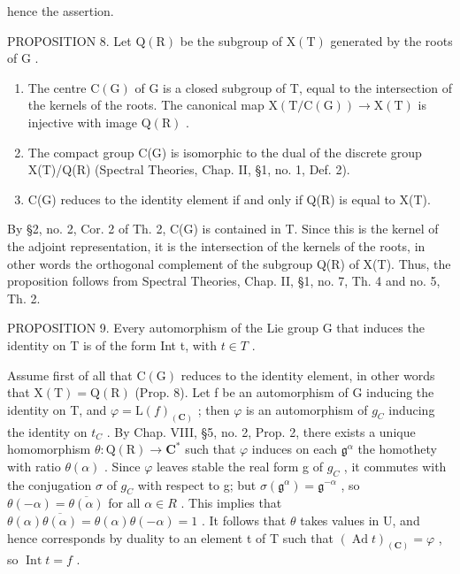 hence the assertion.

PROPOSITION 8. Let \(\mathrm{Q}(\mathrm{R})\) be the subgroup of \(\mathrm{X}(\mathrm{T})\) generated by the roots of \(\mathrm{G}\) .

\begin{enumerate}
\def\labelenumi{\alph{enumi})}
\item
  The centre \(\mathrm{C}(\mathrm{G})\) of G is a closed subgroup of T, equal to the intersection of the kernels of the roots. The canonical map \(\mathrm{X}(\mathrm{T}/\mathrm{C}(\mathrm{G})) \to \mathrm{X}(\mathrm{T})\) is injective with image \(\mathrm{Q}(\mathrm{R})\) .
\item
  The compact group C(G) is isomorphic to the dual of the discrete group X(T)/Q(R) (Spectral Theories, Chap. II, §1, no. 1, Def. 2).
\item
  C(G) reduces to the identity element if and only if Q(R) is equal to X(T).
\end{enumerate}

By §2, no. 2, Cor. 2 of Th. 2, C(G) is contained in T. Since this is the kernel of the adjoint representation, it is the intersection of the kernels of the roots, in other words the orthogonal complement of the subgroup Q(R) of X(T). Thus, the proposition follows from Spectral Theories, Chap. II, §1, no. 7, Th. 4 and no. 5, Th. 2.

PROPOSITION 9. Every automorphism of the Lie group G that induces the identity on T is of the form Int t, with \(t \in T\) .

Assume first of all that \(\mathrm{C}(\mathrm{G})\) reduces to the identity element, in other words that \(\mathrm{X}(\mathrm{T}) = \mathrm{Q}(\mathrm{R})\) (Prop. 8). Let f be an automorphism of G inducing the identity on T, and \(\varphi = \mathrm{L}(f)_{(\mathbf{C})}\) ; then \(\varphi\) is an automorphism of \(g_{C}\) inducing the identity on \(t_{C}\) . By Chap. VIII, §5, no. 2, Prop. 2, there exists a unique homomorphism \(\theta : \mathrm{Q}(\mathrm{R}) \to \mathbf{C}^{*}\) such that \(\varphi\) induces on each \(\mathfrak{g}^{\alpha}\) the homothety with ratio \(\theta(\alpha)\) . Since \(\varphi\) leaves stable the real form g of \(g_{C}\) , it commutes with the conjugation \(\sigma\) of \(g_{C}\) with respect to g; but \(\sigma(\mathfrak{g}^{\alpha}) = \mathfrak{g}^{-\alpha}\) , so \(\theta(-\alpha) = \overline{\theta(\alpha)}\) for all \(\alpha \in R\) . This implies that \(\theta(\alpha)\overline{\theta(\alpha)} = \theta(\alpha)\theta(-\alpha) = 1\) . It follows that \(\theta\) takes values in U, and hence corresponds by duality to an element t of T such that \((\operatorname{Ad} t)_{(\mathbf{C})} = \varphi\) , so \(\operatorname{Int} t = f\) .

